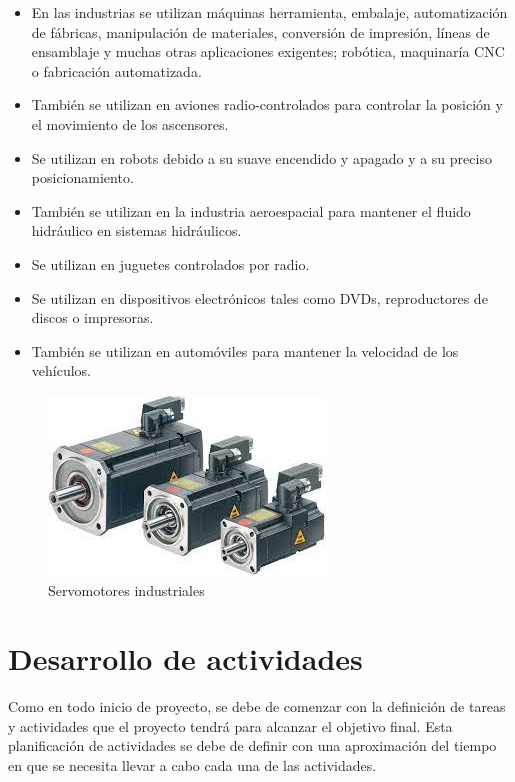 \documentclass[12pt,titlepage]{article}
\begin{document}
\begin{itemize}
\item En las industrias se utilizan máquinas herramienta, embalaje, automatización de fábricas, manipulación de materiales, conversión de impresión, líneas de ensamblaje y muchas otras aplicaciones exigentes; robótica, maquinaría CNC o fabricación automatizada. 
\item También se utilizan en aviones radio-controlados para controlar la posición y el movimiento de los ascensores. 
\item Se utilizan en robots debido a su suave encendido y apagado y a su preciso posicionamiento. 
\item También se utilizan en la industria aeroespacial para mantener el fluido hidráulico en sistemas hidráulicos. 
\item Se utilizan en juguetes controlados por radio. 
\item Se utilizan en dispositivos electrónicos tales como DVDs, reproductores de discos o impresoras. 
\item También se utilizan en automóviles para mantener la velocidad de los vehículos. 
\end{itemize}

\begin{figure}[htbp]
\hspace*{4.2cm} 
\includegraphics[scale=0.70]{servomotores}
\caption{Servomotores industriales}
\end{figure}
\newpage
\section{ Desarrollo de actividades}
Como en todo inicio de proyecto, se debe de comenzar con la definición de tareas y actividades que el proyecto tendrá para alcanzar el objetivo final. Esta planificación de actividades se debe de definir con una aproximación del tiempo en que se necesita llevar a cabo cada una de las actividades. \\ \\
\end{document}
